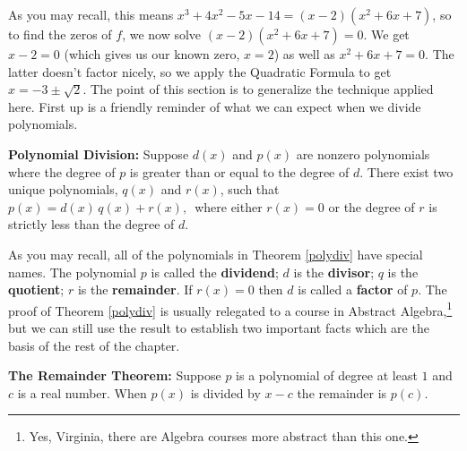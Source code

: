 \setlength\arraycolsep{5pt}
\setlength\extrarowheight{0pt}

As you may recall, this means $x^3 + 4x^2-5x-14=(x-2)\left(x^2+6x+7\right)$, so to find the zeros of $f$, we now solve $(x-2)\left(x^2+6x+7\right)=0$.   We get $x-2=0$ (which gives us our known zero, $x=2$) as well as $x^2+6x+7=0$.   The latter doesn't factor nicely, so we apply the Quadratic Formula to get $x = -3 \pm \sqrt{2}$.  The point of this section is to generalize the technique applied here.  First up is a friendly reminder of what we can expect when we divide polynomials.

\smallskip

\colorbox{ResultColor}{\bbm

\begin{thm} \label{polydiv} \textbf{Polynomial Division:}  Suppose $d(x)$ and $p(x)$ are nonzero polynomials where the degree of $p$ is greater than or equal to the degree of $d$.  There exist two unique polynomials, $q(x)$ and $r(x)$, such that $p(x) = d(x) \, q(x) + r(x),\,$ where either $r(x) = 0$ or the degree of $r$ is strictly less than the degree of $d$.
\end{thm}
\ebm}

\smallskip

As you may recall, all of the polynomials in Theorem \ref{polydiv} have special names.  The polynomial $p$ is called the  \textbf{dividend}; $d$ is the  \textbf{divisor}; $q$ is the  \textbf{quotient}; $r$ is the  \textbf{remainder}.  If $r(x)=0$ then $d$ is called a  \textbf{factor} of $p$.  The proof of Theorem \ref{polydiv} is usually relegated to a course in Abstract Algebra,\footnote{Yes, Virginia, there are Algebra courses more abstract than this one.} but we can still use the result to establish two important facts which are the basis of the rest of the chapter.

\smallskip

\colorbox{ResultColor}{\bbm

\begin{thm} \label{remainderthm}\textbf{The Remainder Theorem:}  Suppose $p$ is a polynomial of degree at least $1$ and $c$ is a real number.  When $p(x)$ is divided by $x-c$ the remainder is $p(c)$.  

\end{thm}
\ebm}

